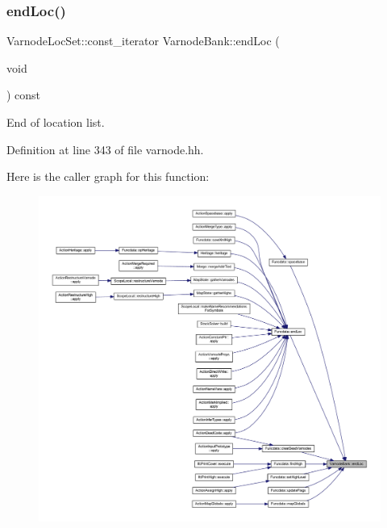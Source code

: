 \mbox{\label{class_varnode_bank_a6b8d7eeeab4dd2dd9fe87905773ed3cc}} 
\subsubsection{\texorpdfstring{endLoc()}{endLoc()}\hspace{0.1cm}{\footnotesize\ttfamily [1/6]}}
{\footnotesize\ttfamily Varnode\+Loc\+Set\+::const\+\_\+iterator Varnode\+Bank\+::end\+Loc (\begin{DoxyParamCaption}\item[{void}]{ }\end{DoxyParamCaption}) const\hspace{0.3cm}{\ttfamily [inline]}}



End of location list. 



Definition at line 343 of file varnode.\+hh.

Here is the caller graph for this function\+:
\nopagebreak
\begin{figure}[H]
\begin{center}
\leavevmode
\includegraphics[width=350pt]{class_varnode_bank_a6b8d7eeeab4dd2dd9fe87905773ed3cc_icgraph}
\end{center}
\end{figure}
\mbox{\label{class_varnode_bank_abdbae6976cda0615c7bf24026bac0d67}} 
